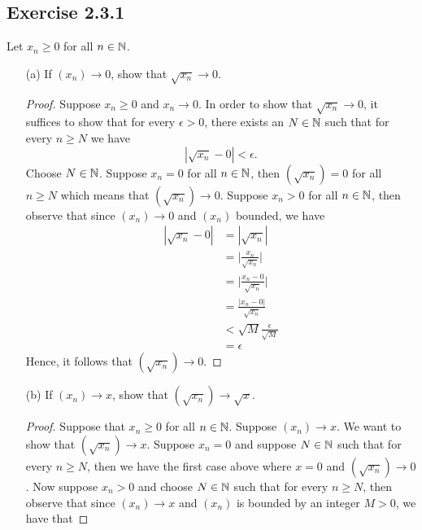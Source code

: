 \subsection{Exercise 2.3.1} Let \( x_n \geq 0\) for all \( n \in \mathbb{N} \).

\begin{enumerate}
    \item[(a)] If \( (x_n ) \to 0 \), show that \( \sqrt{x_n} \to 0\).
        \begin{proof}
            Suppose \( x_n \geq 0 \) and \( x_n \to 0\). In order to show that \( \sqrt{x_n} \to 0\), it suffices to show that for every \( \epsilon> 0\), there exists an \( N \in \mathbb{N} \) such that for every \( n \geq N \) we have 
            \[ | \sqrt{x_n} - 0  | < \epsilon.\]
            Choose \( N \in \mathbb{N}\). Suppose \( x_n = 0 \) for all \( n \in \mathbb{N} \), then \( ( \sqrt{x_n}) = 0 \) for all \( n \geq N \) which means that \( ( \sqrt{x_n}) \to 0\). Suppose \( x_n > 0 \) for all \( n \in \mathbb{N}\), then observe that since \( (x_n) \to 0\)  and \( (x_n)\) bounded, we have 
            \begin{align*}
             | \sqrt{x_n} - 0 | &= | \sqrt{x_n} | \\
                            &= \Big| \frac{x_n}{ \sqrt{x_n}} \Big| \\
                            &=  \Big| \frac{x_n - 0}{ \sqrt{x_n}} \Big| \\ 
                            &=  \frac{|x_n - 0|}{ \sqrt{x_n}}  \\
                            &< \sqrt{M} \frac{ \epsilon }{ \sqrt{M} }  \\ 
                            &= \epsilon 
            \end{align*}
            Hence, it follows that \( ( \sqrt{x_n}) \to 0\).
        \end{proof}
    \item[(b)] If \( (x_n) \to x\), show that \( (\sqrt{x_n}) \to \sqrt{x}\).
        \begin{proof}
            Suppose that \( x_n \geq 0\) for all \( n \in \mathbb{N} \). Suppose \( (x_n) \to x \). We want to show that \( ( \sqrt{x_n}) \to x\). Suppose \( x_n = 0 \) and suppose \( N \in \mathbb{N} \) such that for every \( n \geq N \), then we have the first case above where \( x=0\) and \( ( \sqrt{x_n}) \to 0\). Now suppose \( x_n > 0 \) and choose \( N \in \mathbb{N} \) such that for every \( n \geq N \), then observe that since \( (x_n ) \to x \) and \( (x_n)\) is bounded by an integer \( M > 0 \), we have that 


\end{proof}
\end{enumerate}
